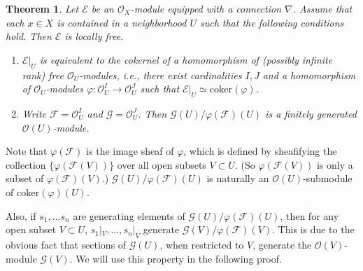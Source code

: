 \documentclass[12pt,a4paper,notitlepage]{report}
\theoremstyle{definition}
\theoremstyle{plain}
\newtheorem{thm}[df]{Theorem}
\newcommand{\scr}{\mathscr}
\newcommand{\mbb}{\mathbb}
\newcommand{\coker}{\mathrm{coker}}
\numberwithin{equation}{section}
\begin{document}


\begin{thm}\label{lb66}
Let $\scr E$ be an $\scr O_X$-module equipped with a connection $\nabla$. Assume that  each $x\in X$ is contained in a neighborhood $U$ such that the following conditions hold. Then $\scr E$ is locally free.
\begin{enumerate}[label=(\alph*)]
\item $\scr E|_U$ is equivalent to the cokernel of a homomorphism of (possibly infinite rank) free $\scr O_U$-modules, i.e., there exist cardinalities $I,J$ and a homomorphism of $\scr O_U$-modules $\varphi:\scr O_U^I\rightarrow\scr O_U^J$  such that $\scr E|_U\simeq\mathrm{coker}(\varphi)$.
\item Write $\scr F=\scr O^I_U$ and $\scr G=\scr O^J_U$. Then $\scr G(U)/\varphi(\scr F)(U)$ is a finitely generated $\scr O(U)$-module. 
\end{enumerate}
\end{thm}


Note that  $\varphi(\scr F)$ is the image sheaf of $\varphi$, which is defined by sheafifying the collection $\{\varphi(\scr F(V))\}$ over all open subsets $V\subset U$. (So $\varphi(\scr F(V))$ is only a subset of $\varphi(\scr F)(V)$.) $\scr G(U)/\varphi(\scr F)(U)$ is naturally an $\scr O(U)$-submodule of $\coker(\varphi)(U)$.

Also, if $s_1,\dots s_n$ are generating elements of $\scr G(U)/\varphi(\scr F)(U)$, then for any open subset $V\subset U$, $s_1|_V,\dots,s_n|_V$ generate $\scr G(V)/\varphi(\scr F)(V)$. This is due to the obvious fact that sections of $\scr G(U)$, when restricted to $V$, generate the $\scr O(V)$-module $\scr G(V)$. We will use this property in the following proof.
 
\end{document}
